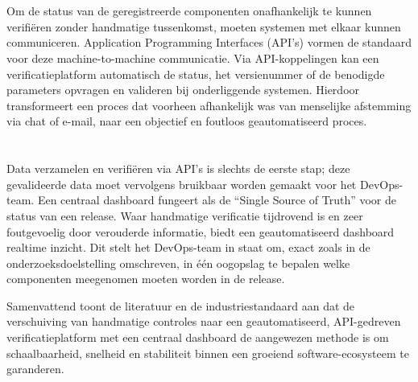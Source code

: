 \section{}%
\label{sec:api-integraties}

Om de status van de geregistreerde componenten onafhankelijk te kunnen verifiëren zonder handmatige tussenkomst, moeten systemen met elkaar kunnen communiceren. Application Programming Interfaces (API's) vormen de standaard voor deze machine-to-machine communicatie. Via API-koppelingen kan een verificatieplatform automatisch de status, het versienummer of de benodigde parameters opvragen en valideren bij onderliggende systemen. Hierdoor transformeert een proces dat voorheen afhankelijk was van menselijke afstemming via chat of e-mail, naar een objectief en foutloos geautomatiseerd proces.

\section{}%
\label{sec:dashboards}

Data verzamelen en verifiëren via API's is slechts de eerste stap; deze gevalideerde data moet vervolgens bruikbaar worden gemaakt voor het DevOps-team. Een centraal dashboard fungeert als de ``Single Source of Truth'' voor de status van een release. Waar handmatige verificatie tijdrovend is en zeer foutgevoelig door verouderde informatie, biedt een geautomatiseerd dashboard realtime inzicht. Dit stelt het DevOps-team in staat om, exact zoals in de onderzoeksdoelstelling omschreven, in één oogopslag te bepalen welke componenten meegenomen moeten worden in de release.

Samenvattend toont de literatuur en de industriestandaard aan dat de verschuiving van handmatige controles naar een geautomatiseerd, API-gedreven verificatieplatform met een centraal dashboard de aangewezen methode is om schaalbaarheid, snelheid en stabiliteit binnen een groeiend software-ecosysteem te garanderen.